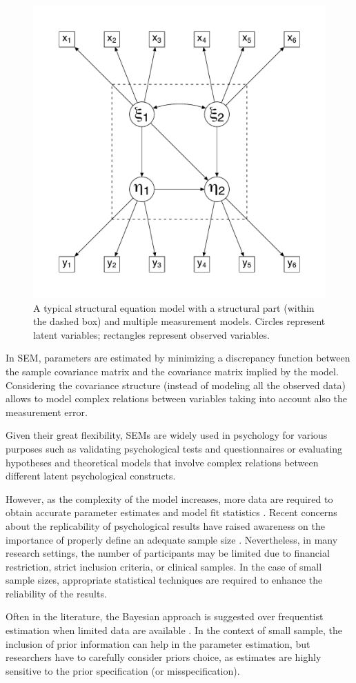 \documentclass[graybox]{svmult}
\begin{document}
\begin{figure}[t]
	\sidecaption
	\label{fig:example_sem}
	\includegraphics[width = .50\textwidth]{figure/figure1}
	\caption{A typical structural equation model with a structural part (within the dashed box) and multiple measurement models. Circles represent latent variables; rectangles represent observed variables.}
\end{figure}

In SEM, parameters are estimated by minimizing a discrepancy function between the sample covariance matrix and the covariance matrix implied by the model. Considering the covariance structure (instead of modeling all the observed data) allows to model complex relations between variables taking into account also the  measurement error.

Given their great flexibility, SEMs are widely used in psychology for various purposes such as validating psychological tests and questionnaires or evaluating hypotheses and theoretical models that involve complex relations between different latent psychological constructs.

However, as the complexity of the model increases, more data are required to obtain accurate parameter estimates and model fit statistics \cite{wolfSampleSizeRequirements2013}. Recent concerns about the replicability of psychological results have raised awareness on the importance of properly define an adequate sample size \cite{ioannidisWhyMostPublished2005, opensciencecollaborationEstimatingReproducibilityPsychological2015}.  Nevertheless, in many research settings, the number of participants may be limited due to financial restriction, strict inclusion criteria, or clinical samples. In the case of small sample sizes, appropriate statistical techniques are required to enhance the reliability of the results.

Often in the literature, the Bayesian approach is suggested over frequentist estimation when limited data are available \cite{mcneishUsingBayesianMethods2016a}.  In the context of small sample, the inclusion of prior information can help in the parameter estimation, but researchers have to carefully consider priors choice, as estimates are highly sensitive to the prior specification (or misspecification).
\end{document}
